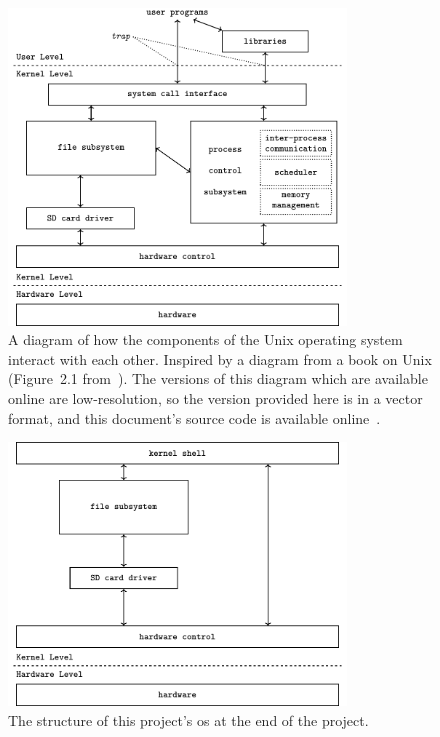 \documentclass{article}
\begin{document}
\begin{figure}[htbp]
    \centering
    \includegraphics[width=0.8\textwidth]{build/os-block-diagram.pdf}
    \caption{A diagram of how the components of the Unix operating system
        interact with each other. Inspired by a diagram from a book on Unix
        (Figure~2.1 from~\cite{design-of-unix-os}). The versions of this
        diagram which are available online are low-resolution, so the version
        provided here is in a vector format, and this document's source code is
        available online~\cite{this-document}.}
    \label{fig:os-block-diagram}
\end{figure}

\begin{figure}[htbp]
    \centering
    \includegraphics[width=0.8\textwidth]{build/finished-block-diagram.pdf}
    \caption{The structure of this project's \gls{os} at the end of the
    project.}
    \label{fig:finished_block_diagram}
\end{figure}
\end{document}
